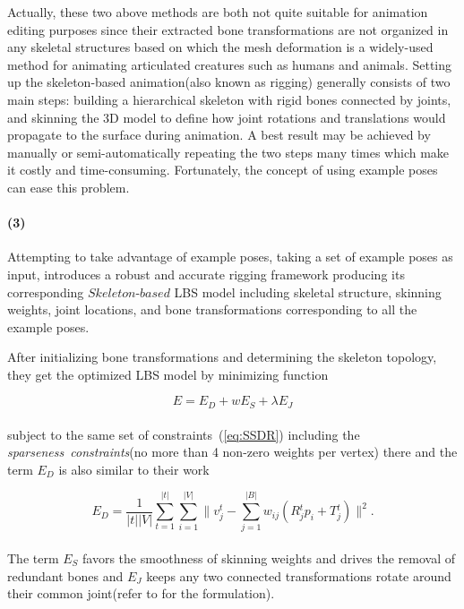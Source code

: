 \vspace{15pt}
Actually, these two above methods are both not quite suitable for animation editing purposes
since their extracted bone transformations are not organized in any skeletal structures
based on which the mesh deformation is a widely-used method for animating articulated creatures such as humans and animals.
Setting up the skeleton-based animation(also known as rigging) generally consists of two main steps:
building a hierarchical skeleton with rigid bones connected by joints,
and skinning the 3D model to define how joint rotations and translations would propagate to the surface during animation.
A best result may be achieved by manually or semi-automatically repeating the two steps many times which make it costly and time-consuming.
Fortunately, the concept of using example poses can ease this problem\cite{schaefer2007example}.

\paragraph{(3)}
Attempting to take advantage of example poses, taking a set of example poses as input,
\cite{le2014ras} introduces a robust and accurate rigging framework producing its corresponding $Skeleton$-$based$ LBS model including skeletal structure, skinning weights, joint locations, and bone transformations corresponding to all the example poses.

After initializing bone transformations and determining the skeleton topology, they get the optimized LBS model by minimizing function

\small{
\begin{equation}
 \label{eq:SkeletonLBS}
 E=E_{D}+wE_{S}+\lambda E_{J}
\end{equation}
}
\\
subject to the same set of constraints~(\ref{eq:SSDR}) including the \textit{sparseness~constraints}(no more than 4 non-zero weights per vertex) there and  the term $E_{D}$ is also similar to their work

\small{
\begin{equation}
 \label{eq:SRFE}
 E_{D}=\frac{1}{|t||V|}
 \sum_{t=1}^{|t|} \sum_{i=1}^{|V|}
 \|v{_{j}^{t}}
 -\sum_{j=1}^{|B|} w_{ij} ( R{_{j}^{t}}p_{i} + T{_{j}^{t}} )
 \|^2.
\end{equation}
}
\\
The term $E_{S}$ favors the smoothness of skinning weights and drives the removal of redundant bones and $E_{J}$ keeps any two connected transformations rotate around their common joint(refer to\cite{le2014ras} for the formulation).

